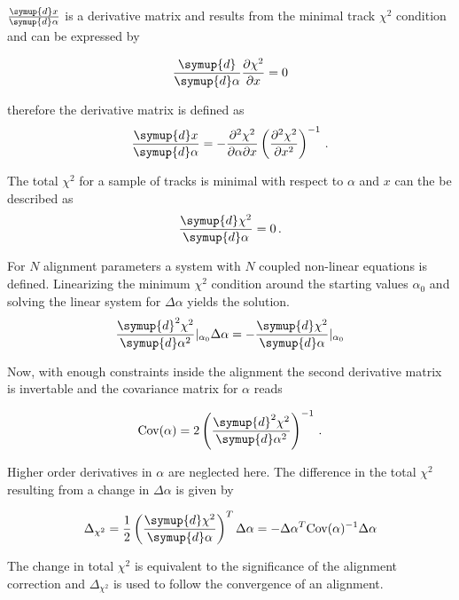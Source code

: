 $\frac{\symup{d}x}{\symup{d}\alpha}$ is a derivative matrix and results from the minimal track $\chi^2$ condition and can be expressed by

\begin{equation}
  \frac{\symup{d}}{\symup{d}\alpha}\frac{\partial \chi^2}{\partial x} = 0
\end{equation}

therefore the derivative matrix is defined as
\begin{equation}
  \frac{\symup{d}x}{\symup{d}\alpha} = -\frac{\partial^2\chi^2}{\partial\alpha\partial x} \left( \frac{\partial^2\chi^2}{\partial x^2} \right)^{-1}\,.
\end{equation}

The total $\chi^2$ for a sample of tracks is minimal with respect to $\alpha$ and $x$ can the be described as
\begin{equation}
  \frac{\symup{d}\chi^2}{\symup{d}\alpha} = 0\,.
\end{equation}

For $N$ alignment parameters a system with $N$ coupled non-linear equations is defined.
Linearizing the minimum $\chi^2$ condition around the starting values $\alpha_0$ and solving the linear system for $\Delta\alpha$ yields the solution.
\begin{equation}
  \frac{\symup{d}^2\chi^2}{\symup{d}\alpha^2}\vert_{\alpha_0} \Delta\alpha =
  -\frac{\symup{d}\chi^2}{\symup{d}\alpha}\vert_{\alpha_0}
\end{equation}

Now, with enough constraints inside the alignment the second derivative matrix is invertable and the covariance matrix for $\alpha$ reads

\begin{equation*}
  \text{Cov}(\alpha) = 2 \left( \frac{\symup{d}^2\chi^2}{\symup{d}\alpha^2} \right)^{-1}\,.
\end{equation*}

Higher order derivatives in $\alpha$ are neglected here. The difference in the total $\chi^2$ resulting from a change in $\Delta\alpha$ is given by

\begin{equation*}
  \Delta_{\chi^2} = \frac{1}{2} \left( \frac{\symup{d}\chi^2}{\symup{d}\alpha} \right)^T \Delta\alpha = -\Delta\alpha^T \text{Cov}(\alpha)^{-1}\Delta\alpha
\end{equation*}

The change in total $\chi^2$ is equivalent to the significance of the alignment correction and $\Delta_{\chi^2}$ is used to follow the convergence of an alignment.
